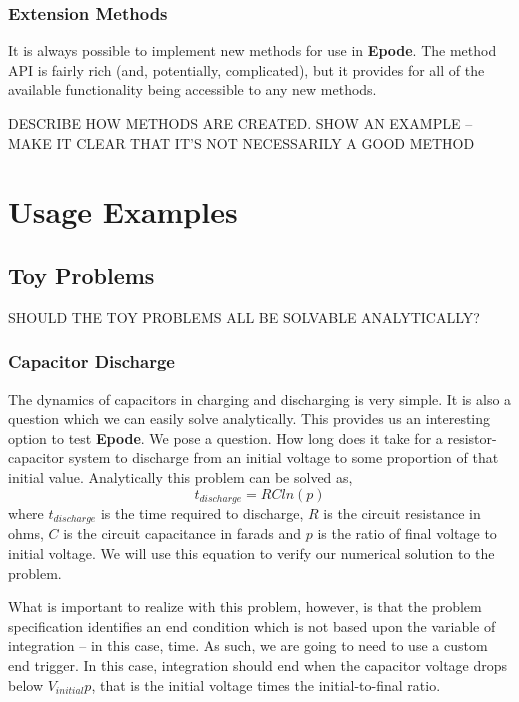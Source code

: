\documentclass[letterpaper,10pt]{book}
\newcommand{\epode}[0]{\textbf{Epode}}
\begin{document}
    \section{Extension Methods}
      It is always possible to implement new methods for use in \epode{}.  The method API is fairly rich (and, potentially, complicated), but it provides for all of the available functionality being accessible to any new methods.
      
      DESCRIBE HOW METHODS ARE CREATED. SHOW AN EXAMPLE -- MAKE IT CLEAR THAT IT'S NOT NECESSARILY A GOOD METHOD
      
  
\part{Usage Examples}

  \chapter{Toy Problems}
    SHOULD THE TOY PROBLEMS ALL BE SOLVABLE ANALYTICALLY?
    
    \section{Capacitor Discharge}
      The dynamics of capacitors in charging and discharging is very simple.  It is also a question which we can easily solve analytically.  This provides us an interesting option to test \epode{}.  We pose a question.  How long does it take for a resistor-capacitor system to discharge from an initial voltage to some proportion of that initial value.  Analytically this problem can be solved as,
      \begin{equation}
	t_{discharge} = R Cln(p)
      \end{equation}
      where $t_{discharge}$ is the time required to discharge, $R$ is the circuit resistance in ohms, $C$ is the circuit capacitance in farads and $p$ is the ratio of final voltage to initial voltage.  We will use this equation to verify our numerical solution to the problem.
      
      What is important to realize with this problem, however, is that the problem specification identifies an end condition which is not based upon the variable of integration -- in this case, time.  As such, we are going to need to use a custom end trigger.  In this case, integration should end when the capacitor voltage drops below $V_{initial}p$, that is the initial voltage times the initial-to-final ratio.
      
\end{document}
